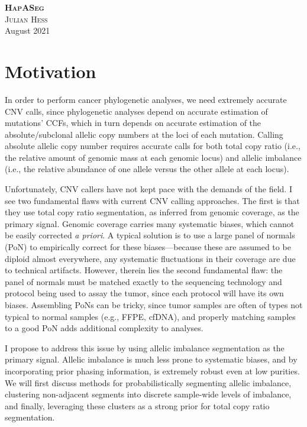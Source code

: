 \documentclass[10pt,letter]{article}
\numberwithin{equation}{section}
\begin{document}
\noindent\textbf{\textsc{HapASeg}}\\
\noindent\textsc{Julian Hess}\\
 August 2021\\

\section{Motivation}

In order to perform cancer phylogenetic analyses, we need extremely accurate CNV calls, since phylogenetic analyses depend on accurate estimation of mutations' CCFs, which in turn depends on accurate estimation of the absolute/subclonal allelic copy numbers at the loci of each mutation. Calling absolute allelic copy number requires accurate calls for both total copy ratio (i.e., the relative amount of genomic mass at each genomic locus) and allelic imbalance (i.e., the relative abundance of one allele versus the other allele at each locus).

Unfortunately, CNV callers have not kept pace with the demands of the field. I see two fundamental flaws with current CNV calling approaches. The first is that they use total copy ratio segmentation, as inferred from genomic coverage, as the primary signal. Genomic coverage carries many systematic biases, which cannot be easily corrected \textit{a priori}. A typical solution is to use a large panel of normals (PoN) to empirically correct for these biases---because these are assumed to be diploid almost everywhere, any systematic fluctuations in their coverage are due to technical artifacts. However, therein lies the second fundamental flaw: the panel of normals must be matched exactly to the sequencing technology and protocol being used to assay the tumor, since each protocol will have its own biases. Assembling PoNs can be tricky, since tumor samples are often of types not typical to normal samples (e.g., FFPE, cfDNA), and properly matching samples to a good PoN adds additional complexity to analyses.

I propose to address this issue by using allelic imbalance segmentation as the primary signal. Allelic imbalance is much less prone to systematic biases, and by incorporating prior phasing information, is extremely robust even at low purities. We will first discuss methods for probabilistically segmenting allelic imbalance, clustering non-adjacent segments into discrete sample-wide levels of imbalance, and finally, leveraging these clusters as a strong prior for total copy ratio segmentation.
\end{document}
